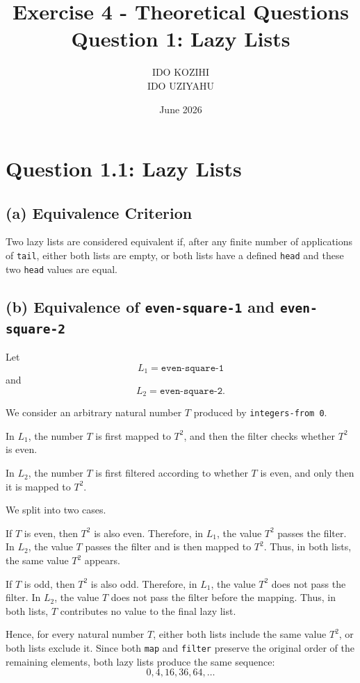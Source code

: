 \documentclass{article}
\title{Exercise 4 - Theoretical Questions\\
Question 1: Lazy Lists}
\author{
IDO KOZIHI \\
IDO UZIYAHU
}
\date{June 2026}
\begin{document}
\maketitle

\section*{Question 1.1: Lazy Lists}

\subsection*{(a) Equivalence Criterion}

Two lazy lists are considered equivalent if, after any finite number of applications of \texttt{tail}, either both lists are empty, or both lists have a defined \texttt{head} and these two \texttt{head} values are equal.

\subsection*{(b) Equivalence of \texttt{even-square-1} and \texttt{even-square-2}}

Let
\[
L_1 = \texttt{even-square-1}
\]
and
\[
L_2 = \texttt{even-square-2}.
\]

We consider an arbitrary natural number \(T\) produced by \texttt{integers-from 0}.

In \(L_1\), the number \(T\) is first mapped to \(T^2\), and then the filter checks whether \(T^2\) is even.

In \(L_2\), the number \(T\) is first filtered according to whether \(T\) is even, and only then it is mapped to \(T^2\).

We split into two cases.

If \(T\) is even, then \(T^2\) is also even. Therefore, in \(L_1\), the value \(T^2\) passes the filter. In \(L_2\), the value \(T\) passes the filter and is then mapped to \(T^2\). Thus, in both lists, the same value \(T^2\) appears.

If \(T\) is odd, then \(T^2\) is also odd. Therefore, in \(L_1\), the value \(T^2\) does not pass the filter. In \(L_2\), the value \(T\) does not pass the filter before the mapping. Thus, in both lists, \(T\) contributes no value to the final lazy list.

Hence, for every natural number \(T\), either both lists include the same value \(T^2\), or both lists exclude it. Since both \texttt{map} and \texttt{filter} preserve the original order of the remaining elements, both lazy lists produce the same sequence:
\[
0, 4, 16, 36, 64, \ldots
\]
\end{document}
